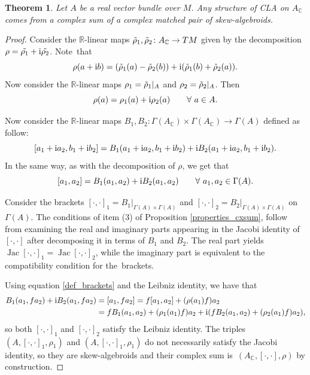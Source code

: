 \documentclass[pdftex]{sigma}
\numberwithin{equation}{section}
\newtheorem{Theorem}{Theorem}[section]
\newcommand{\R}{{\mathbb{R}}}
\newcommand{\C}{{\mathbb{C}}}
\DeclareMathOperator{\jc}{Jac}
\begin{document}
\begin{Theorem}\label{cx_uniqueness}
Let $A$ be a real vector bundle over $M$. Any structure of CLA on $A_{\C}$ comes from a complex sum of a complex matched pair of skew-algebroids.
\end{Theorem}
\begin{proof}
Consider the $\R$-linear maps $\Tilde{\rho}_1,\Tilde{\rho}_2\colon A_{\C}\to TM$ given by the decomposition $\rho=\Tilde{\rho_1}+{\rm i}\Tilde{\rho_2}$. Note~that
\[\rho(a+{\rm i}b)=(\Tilde{\rho}_1(a)-\Tilde{\rho}_2(b))+{\rm i}(\Tilde{\rho}_1(b)+\Tilde{\rho}_2(a)).\]
Now consider the $\R$-linear maps $\rho_1=\Tilde{\rho}_1|_{A}$ and $\rho_2=\Tilde{\rho}_2|_{A}$. Then
\[\rho(a)=\rho_1(a)+{\rm i}\rho_2(a) \qquad \forall\ a\in A.\]

Now consider the $\R$-linear maps $B_1, B_2\colon \Gamma(A_{\C})\times \Gamma(A_{\C})\to \Gamma (A)$ defined as follow:
\[[a_1+{\rm i} a_2, b_1+{\rm i}b_2]=B_1(a_1+{\rm i} a_2, b_1+{\rm i}b_2)+{\rm i}B_2(a_1+{\rm i} a_2, b_1+{\rm i}b_2).\]
In the same way, as with the decomposition of $\rho$, we get that
\begin{equation}\label{def_brackets}
  [a_1,a_2]=B_1(a_1, a_2)+{\rm i}B_2(a_1,a_2) \qquad\forall\ a_1,a_2\in \Gamma(A).
\end{equation}

Consider the brackets $[\cdot,\cdot]_1=B_1|_{\Gamma(A)\times\Gamma(A)}$ and $[\cdot,\cdot]_2=B_2|_{\Gamma(A)\times \Gamma(A)}$ on $\Gamma(A)$. The conditions of item (3) of Proposition \ref{properties_cxsum}, follow from examining the real and imaginary parts appearing in the Jacobi identity of $[\cdot,\cdot]$ after decomposing it in terms of $B_1$ and $B_2$. The real part yields $\jc[\cdot,\cdot]_1=\jc[\cdot,\cdot]_2$, while the imaginary part is equivalent to the compatibility condition for the~brackets.

Using equation \eqref{def_brackets} and the Leibniz identity, we have that
\begin{align*}
  B_1(a_1, fa_2)+{\rm i}B_2(a_1, fa_2)&= [a_1, fa_2]
   =f[a_1,a_2]+(\rho(a_1)f)a_2\\
&=fB_1(a_1,a_2)+(\rho_1(a_1)f)a_2+{\rm i}(fB_2(a_1,a_2)+(\rho_2(a_1)f) a_2),
\end{align*}
so both $[\cdot,\cdot]_1$ and $[\cdot,\cdot]_2$ satisfy the Leibniz identity.
The triples $(A,[\cdot,\cdot]_1, \rho_1)$ and $(A,[\cdot,\cdot]_1, \rho_1)$ do not necessarily satisfy the Jacobi identity, so they are skew-algebroids and their complex sum is~$(A_{\C},[\cdot,\cdot],\rho)$ by construction.
\end{proof}
\end{document}
